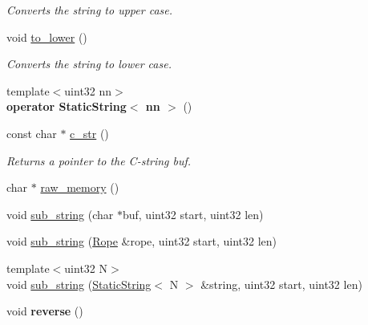 \begin{DoxyCompactItemize}
\begin{DoxyCompactList}\small\item\em Converts the string to upper case. \end{DoxyCompactList}\item 
\hypertarget{classetk_1_1_static_string_a2d09b6cf3621102f7a5c3e0fea06591b}{void \hyperlink{classetk_1_1_static_string_a2d09b6cf3621102f7a5c3e0fea06591b}{to\-\_\-lower} ()}\label{classetk_1_1_static_string_a2d09b6cf3621102f7a5c3e0fea06591b}

\begin{DoxyCompactList}\small\item\em Converts the string to lower case. \end{DoxyCompactList}\item 
\hypertarget{classetk_1_1_static_string_a63047d1ab54d84e4fda48b8e7bfd88fd}{{\footnotesize template$<$uint32 nn$>$ }\\{\bfseries operator Static\-String$<$ nn $>$} ()}\label{classetk_1_1_static_string_a63047d1ab54d84e4fda48b8e7bfd88fd}

\item 
\hypertarget{classetk_1_1_static_string_aa775f517938685482baa772fb6cb1734}{const char $\ast$ \hyperlink{classetk_1_1_static_string_aa775f517938685482baa772fb6cb1734}{c\-\_\-str} ()}\label{classetk_1_1_static_string_aa775f517938685482baa772fb6cb1734}

\begin{DoxyCompactList}\small\item\em Returns a pointer to the C-\/string buf. \end{DoxyCompactList}\item 
char $\ast$ \hyperlink{classetk_1_1_static_string_ac305f5f280538b783ef70865c173b14a}{raw\-\_\-memory} ()
\item 
void \hyperlink{classetk_1_1_static_string_af253b76226aefea02ab75f29ee674c5e}{sub\-\_\-string} (char $\ast$buf, uint32 start, uint32 len)
\item 
void \hyperlink{classetk_1_1_static_string_a42a2a9793853352a96b2522ab7938132}{sub\-\_\-string} (\hyperlink{classetk_1_1_rope}{Rope} \&rope, uint32 start, uint32 len)
\item 
{\footnotesize template$<$uint32 N$>$ }\\void \hyperlink{classetk_1_1_static_string_ab1bddc20910d512e0fe79823a3675697}{sub\-\_\-string} (\hyperlink{classetk_1_1_static_string}{Static\-String}$<$ N $>$ \&string, uint32 start, uint32 len)
\item 
\hypertarget{classetk_1_1_static_string_a9caee6af911467e670a539af39117648}{void {\bfseries reverse} ()}\label{classetk_1_1_static_string_a9caee6af911467e670a539af39117648}

\end{DoxyCompactItemize}


